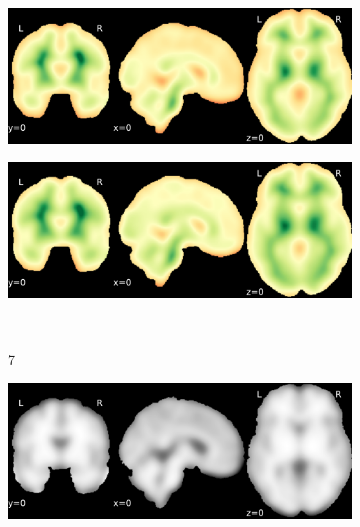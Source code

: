 \documentclass{article}
\begin{document}
\begin{landscape}
\begin{figure}
\begin{subfigure}[t]{0.2\paperheight}
        \end{subfigure}
        \begin{subfigure}[t]{0.2\paperheight}
            \centering
            \includegraphics[width=\textwidth]{figures/sig/15mm/rs_ds001748_sub-adult16_sig.pdf}
        \end{subfigure}
        \begin{subfigure}[t]{0.2\paperheight}
            \centering
            \includegraphics[width=\textwidth]{figures/sig/15mm/rr.rs_ds001748_sub-adult16_sig.pdf}
        \end{subfigure} \\
        \begin{subfigure}[b][][c]{0.01\paperwidth} 7 \vspace*{15pt} \end{subfigure}
        \begin{subfigure}[t]{0.2\paperheight}
            \centering
            \includegraphics[width=\textwidth]{figures/sig/15mm/ieee_ds002338_sub-xp201.pdf}

\end{subfigure}
\end{figure}
\end{landscape}
\end{document}
